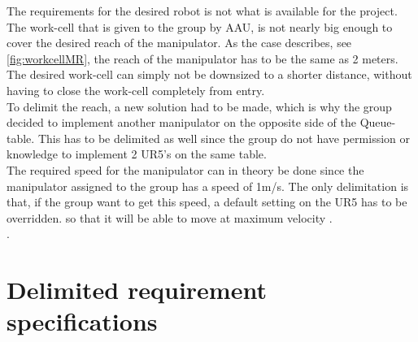 The requirements for the desired robot is not what is available for the project. 
The work-cell that is given to the group by AAU, is not nearly big enough to cover the desired reach of the manipulator. As the case describes, see \ref{fig:workcellMR}, the reach of the manipulator has to be the same as 2 meters. The desired work-cell can simply not be downsized to a shorter distance, without having to close the work-cell completely from entry.\\
To delimit the reach, a new solution had to be made, which is why the group decided to implement another manipulator on the opposite side of the Queue-table. This has to be delimited as well since the group do not have permission or knowledge to implement 2 UR5's on the same table.\\
The required speed for the manipulator can in theory be done since the manipulator assigned to the group has a speed of 1m/s. The only delimitation is that, if the group want to get this speed, a default setting on the UR5 has to be overridden. so that it will be able to move at maximum velocity \cite{UserManual}.\\.

\newpage
\section{Delimited requirement specifications}

